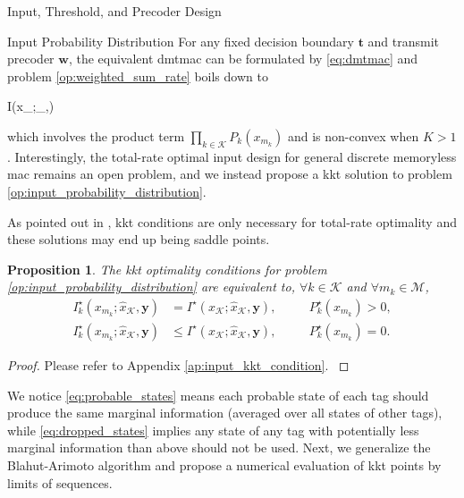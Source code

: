 \documentclass[journal]{IEEEtran}
\newtheorem{proposition}{Proposition}
\begin{document}
\begin{section}{Input, Threshold, and Precoder Design}
	\begin{subsection}{Input Probability Distribution}
		For any fixed decision boundary $\boldsymbol{t}$ and transmit precoder $\boldsymbol{w}$, the equivalent \gls{dmtmac} can be formulated by \eqref{eq:dmtmac} and problem \eqref{op:weighted_sum_rate} boils down to
		\begin{maxi!}
			{}{I(x_{};_{},)}{\label{op:input_probability_distribution}}{}
			\addConstraint{\eqref{co:sum_probability},\eqref{co:nonnegative_probability},}
		\end{maxi!}
		which involves the product term $\prod_{k \in \mathcal{K}} P_k(x_{m_k})$ and is non-convex when $K > 1$.
		Interestingly, the total-rate optimal input design for general discrete memoryless \gls{mac} remains an open problem, and we instead propose a \gls{kkt} solution to problem \eqref{op:input_probability_distribution}.
		\begin{footnote}
			As pointed out in \cite{Buhler2011}, \gls{kkt} conditions are only necessary for total-rate optimality and these solutions may end up being saddle points.
		\end{footnote}
		\begin{proposition}
			The \gls{kkt} optimality conditions for problem \eqref{op:input_probability_distribution} are equivalent to, $\forall k \in \mathcal{K}$ and $\forall m_k \in \mathcal{M}$,
			\begin{subequations}
				\label{eq:input_kkt_condition}
				\begin{alignat}{2}
					I_k^\star(x_{m_k};\hat{x}_{\mathcal{K}},\boldsymbol{y}) & = I^\star(x_{\mathcal{K}};\hat{x}_{\mathcal{K}},\boldsymbol{y}), \quad   &  & P_k^\star(x_{m_k}) > 0,\label{eq:probable_states} \\
					I_k^\star(x_{m_k};\hat{x}_{\mathcal{K}},\boldsymbol{y}) & \le I^\star(x_{\mathcal{K}};\hat{x}_{\mathcal{K}},\boldsymbol{y}), \quad &  & P_k^\star(x_{m_k}) = 0.\label{eq:dropped_states}
				\end{alignat}
			\end{subequations}
			\label{pr:input_kkt_condition}
		\end{proposition}

		\begin{proof}
			Please refer to Appendix \ref{ap:input_kkt_condition}.
			\label{pf:input_kkt_condition}
		\end{proof}

		We notice \eqref{eq:probable_states} means each probable state of each tag should produce the same marginal information (averaged over all states of other tags), while \eqref{eq:dropped_states} implies any state of any tag with potentially less marginal information than above should not be used.
		Next, we generalize the Blahut-Arimoto algorithm \cite{Arimoto1972,Blahut1972a} and propose a numerical evaluation of \gls{kkt} points by limits of sequences.


\end{subsection}
\end{section}
\end{document}
